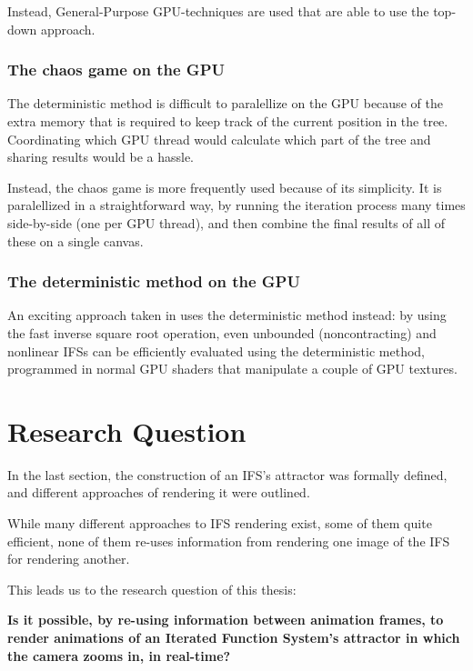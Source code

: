 \documentclass[11pt]{article}
\begin{document}
Instead, General-Purpose GPU-techniques are used that are able to use the top-down approach.

\subsubsection{The chaos game on the GPU}
\label{sec:org029d2ae}
\label{subsection:chaos_game_gpu}

The deterministic method is difficult to paralellize on the GPU because of the extra memory that is required to keep track of the current position in the tree.
Coordinating which GPU thread would calculate which part of the tree and sharing results would be a hassle.

Instead, the chaos game is more frequently used because of its simplicity. It is paralellized in a straightforward way, by running the iteration process many times side-by-side (one per GPU thread),
and then combine the final results of all of these on a single canvas. \cite{green2005gpu}

\subsubsection{The deterministic method on the GPU}
\label{sec:org575e15b}
\label{subsection:deterministic_gpu}

An exciting approach taken in \cite{lawlor2012gpu} uses the deterministic method instead:
by using the fast inverse square root operation, even unbounded (noncontracting) and nonlinear IFSs can be efficiently
evaluated using the deterministic method, programmed in normal GPU shaders that manipulate a couple of GPU textures.


\section{Research Question}
\label{sec:org450d7ed}
\label{section:research_question}

In the last section, the construction of an IFS's attractor was formally defined, 
and different approaches of rendering it were outlined.

While many different approaches to IFS rendering exist, some of them quite efficient,
none of them re-uses information from rendering one image of the IFS for rendering another.

This leads us to the research question of this thesis:

\textbf{\textbf{Is it possible, by re-using information between animation frames, to render animations of an Iterated Function System's attractor in which the camera zooms in, in real-time?}}
\end{document}
